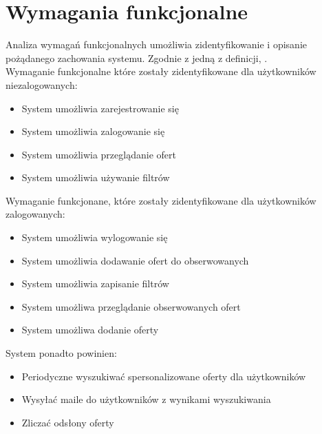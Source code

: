\section{Wymagania funkcjonalne}
\label{sec:wymaganiaFunkcjonalne}
Analiza wymagań funkcjonalnych umożliwia zidentyfikowanie i opisanie pożądanego zachowania systemu. Zgodnie z jedną z definicji, 
.\\ Wymaganie funkcjonalne które zostały zidentyfikowane dla użytkowników niezalogowanych:
\begin{itemize}
\item System umożliwia zarejestrowanie się
\item System umożliwia zalogowanie się 
\item System umożliwia przeglądanie ofert
\item System umożliwia używanie filtrów
\end{itemize}
Wymaganie funkcjonane, które zostały zidentyfikowane dla użytkowników zalogowanych:
\begin{itemize}
\item System umożliwia wylogowanie się
\item System umożliwia dodawanie ofert do obserwowanych
\item System umożliwia zapisanie filtrów
\item System umożliwa przeglądanie obserwowanych ofert
\item System umożliwa dodanie oferty 
\end{itemize}
System ponadto powinien:
\begin{itemize}
\item Periodyczne wyszukiwać spersonalizowane oferty dla użytkowników
\item Wysyłać maile do użytkowników z wynikami wyszukiwania
\item Zliczać odsłony oferty
\end{itemize}

